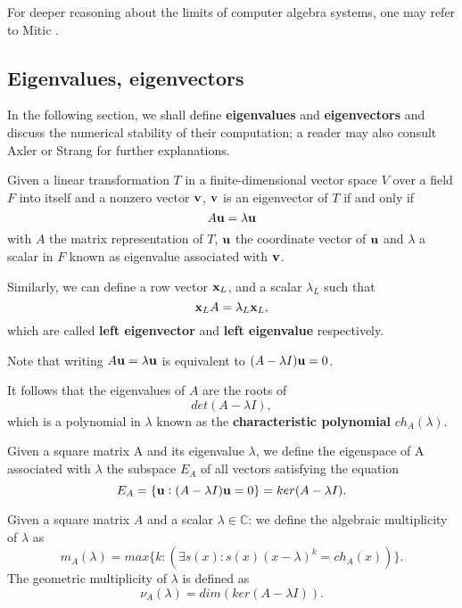 For deeper reasoning about the limits of computer algebra systems, one may refer to Mitic \cite{mitic}.

\subsection*{Eigenvalues, eigenvectors}
In the following section, we shall define \textbf{eigenvalues} and \textbf{eigenvectors} and discuss the numerical stability
of their computation; a reader may also consult Axler \cite{axler} or Strang \cite{strang09} for further explanations.

\begin{definition}
    Given a linear transformation \(T\) in a finite-dimensional vector space \(V\) over a field \(F\) into itself and a nonzero
    vector
    \(\vb{v}\), \(\vb{v}\) is an eigenvector of \(T\) if and only if
    \[ A \vb{u} = \lambda \vb{u} \]
    with \(A\) the matrix representation of \(T\), \(\vb{u}\) the coordinate vector of \(\vb{u}\) and \(\lambda\) a scalar in
    \(F\) known as eigenvalue associated with \(\vb{v}\).

    Similarly, we can define a row vector \(\vb{x}_{L}\), and a scalar \(\lambda_{L}\) such that
    \[\vb{x}_{L}A = \lambda_{L}\vb{x}_{L},\]
    which are called \textbf{left eigenvector} and \textbf{left eigenvalue} respectively.
\end{definition}

\begin{remark}
    Note that writing
    \( A \vb{u} = \lambda \vb{u} \) is equivalent to \( (A - \lambda I)\vb{u} = 0 \).

    It follows that the eigenvalues of $A$ are the roots of
    \[
        det(A - \lambda I),
    \]
    which is a polynomial in \(\lambda\) known as the \textbf{characteristic polynomial} \(ch_{A}(\lambda)\).
\end{remark}

\begin{definition}[Eigenspace]
    Given a square matrix A and its eigenvalue \(\lambda\), we define the eigenspace of A associated with \(\lambda\) the subspace
    \(E_{A}\) of all vectors satisfying the equation
    \[E_{A} = \{\vb{u}: (A - \lambda I)\vb{u} = 0\} = ker(A - \lambda I).\]
\end{definition}

\begin{definition}
    Given a square matrix \(A\) and a scalar \(\lambda \in \mathbb{C}\): we define the algebraic multiplicity of \(\lambda\) as
    \[ m_{A}(\lambda) = max\{k: (\exists s(x): s(x)(x - \lambda)^k = ch_{A}(x))\}.\]
    The geometric multiplicity of \(\lambda\) is defined as
    \[
        \nu_{A}(\lambda) = dim(ker(A - \lambda I)).
    \]
\end{definition}

